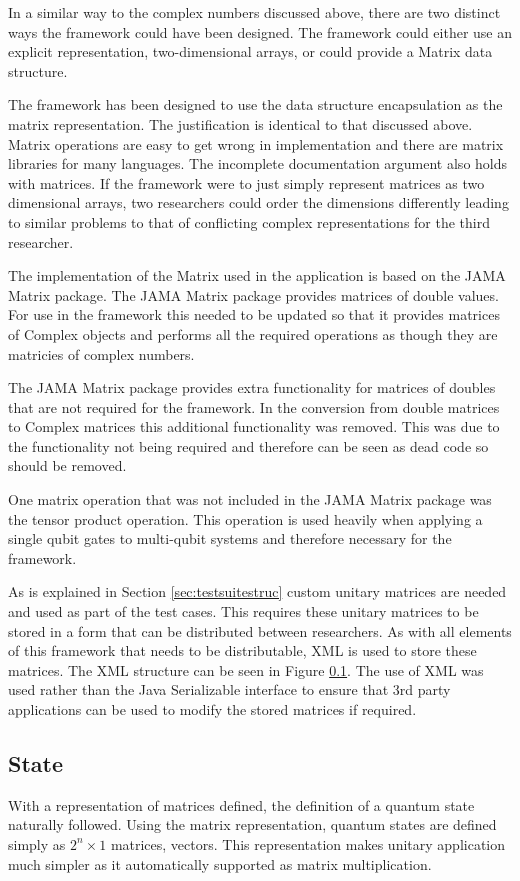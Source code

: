 In a similar way to the complex numbers discussed above, there are two distinct ways the framework could have been designed.
The framework could either use an explicit representation, two-dimensional arrays, or could provide a Matrix data structure.

The framework has been designed to use the data structure encapsulation as the matrix representation.
The justification is identical to that discussed above.
Matrix operations are easy to get wrong in implementation and there are matrix libraries for many languages.
The incomplete documentation argument also holds with matrices.
If the framework were to just simply represent matrices as two dimensional arrays, two researchers could order the dimensions differently leading to similar problems to that of conflicting complex representations for the third researcher.

The implementation of the Matrix used in the application is based on the JAMA Matrix package\cite{javamatrix}.
The JAMA Matrix package provides matrices of double values.
For use in the framework this needed to be updated so that it provides matrices of Complex objects and performs all the required operations as though they are matricies of complex numbers.

The JAMA Matrix package provides extra functionality for matrices of doubles that are not required for the framework.
In the conversion from double matrices to Complex matrices this additional functionality was removed.
This was due to the functionality not being required and therefore can be seen as dead code so should be removed.

One matrix operation that was not included in the JAMA Matrix package was the tensor product operation.
This operation is used heavily when applying a single qubit gates to multi-qubit systems and therefore necessary for the framework.

As is explained in Section \ref{sec:testsuitestruc} custom unitary matrices are needed and used as part of the test cases.
This requires these unitary matrices to be stored in a form that can be distributed between researchers.
As with all elements of this framework that needs to be distributable, XML is used to store these matrices.
The XML structure can be seen in Figure \ref{}.
The use of XML was used rather than the Java Serializable interface to ensure that 3rd party applications can be used to modify the stored matrices if required.

\subsection{State}
With a representation of matrices defined, the definition of a quantum state naturally followed.
Using the matrix representation, quantum states are defined simply as $2^n\times1$ matrices, vectors.
This representation makes unitary application much simpler as it automatically supported as matrix multiplication.

